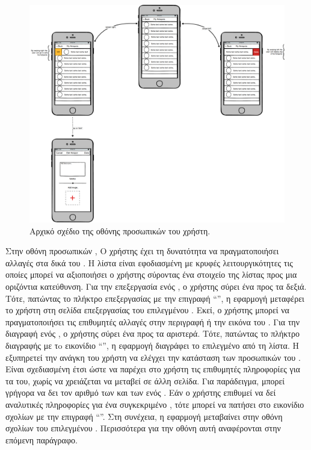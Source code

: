 \begin{figure}[H]
    \centering
    \includegraphics[scale=0.2]{figures/my-hotspots.png}
    \caption{Αρχικό σχέδιο της οθόνης προσωπικών  του χρήστη.}
    \label{myhotspotsmockup}
\end{figure}

Στην οθόνη προσωπικών , Ο χρήστης έχει τη δυνατότητα να πραγματοποιήσει αλλαγές στα δικά του . Η λίστα είναι εφοδιασμένη με κρυφές λειτουργικότητες τις οποίες μπορεί να αξιοποιήσει ο χρήστης σύροντας ένα στοιχείο της λίστας προς μια οριζόντια κατεύθυνση. Για την επεξεργασία ενός , ο χρήστης σύρει ένα  προς τα δεξιά. Τότε, πατώντας το πλήκτρο επεξεργασίας με την επιγραφή ``\textit{}'', η εφαρμογή μεταφέρει το χρήστη στη σελίδα επεξεργασίας του επιλεγμένου . Εκεί, ο χρήστης μπορεί να πραγματοποιήσει τις επιθυμητές αλλαγές στην περιγραφή ή την εικόνα του . Για την διαγραφή ενός , ο χρήστης σύρει ένα  προς τα αριστερά. Τότε, πατώντας το πλήκτρο διαγραφής με τo εικονίδιο ``\textit{}'', η εφαρμογή διαγράφει το επιλεγμένο  από τη λίστα. \newline
\indent
Η  εξυπηρετεί την ανάγκη του χρήστη να ελέγχει την κατάσταση των προσωπικών του . Είναι σχεδιασμένη έτσι ώστε να παρέχει στο χρήστη τις επιθυμητές πληροφορίες για τα  του, χωρίς να χρειάζεται να μεταβεί σε άλλη σελίδα. Για παράδειγμα, μπορεί γρήγορα να δει τον αριθμό των  και των  ενός . Εάν ο χρήστης επιθυμεί να δεί αναλυτικές πληροφορίες για ένα συγκεκριμένο , τότε μπορεί να πατήσει στο εικονίδιο σχολίων με την επιγραφή ``\textit{}''. Στη συνέχεια, η εφαρμογή μεταβαίνει στην οθόνη σχολίων  του επιλεγμένου . Περισσότερα για την οθόνη αυτή αναφέρονται στην επόμενη παράγραφο.

